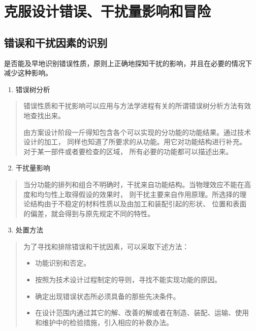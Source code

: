 \documentclass[letterpaper,10pt,english]{sphinxmanual}
\begin{document}
\section{克服设计错误、干扰量影响和冒险}
\label{unit6:id24}

\subsection{错误和干扰因素的识别}
\label{unit6:id25}
是否能及早地识别错误性质，原则上正确地探知干扰的影响，并且在必要的情况下减少这种影响。
\begin{enumerate}
\item {} 
错误树分析

\end{enumerate}
\begin{quote}

错误性质和干扰影响可以应用与方法学进程有关的所谓错误树分析方法有效地查找出来。

由方案设计阶段一斤得知包含各个可以实现的分功能的功能结果。通过技术设计的加工，
同样也知道了所要求的从功能。用它对功能结构进行补充。对于某一部件或者要检查的区域，
所有必要的功能都可以描述出来。
\end{quote}
\begin{enumerate}
\setcounter{enumi}{1}
\item {} 
干扰量影响

\end{enumerate}
\begin{quote}

当分功能的排列和组合不明确时，干扰来自功能结构。当物理效应不能在高度和均匀性上取得假设的效果时，
则干扰主要来自作用原理。所选择的理论结构由于不稳定的材料性质以及由加工和装配引起的形状、
位置和表面的偏差，就会得到与原先规定不同的特性。
\end{quote}
\begin{enumerate}
\setcounter{enumi}{2}
\item {} 
处置方法

\end{enumerate}
\begin{quote}

为了寻找和排除错误和干扰因素，可以采取下述方法：
\begin{itemize}
\item {} 
功能识别和否定。

\item {} 
按照为技术设计过程制定的导则，寻找不能实现功能的原因。

\item {} 
确定出现错误状态所必须具备的那些先决条件。

\item {} 
在设计范围内通过其它的解、改善的解或者在制造、装配、运输、使用和维护中的检验措施，引入相应的补救办法。

\end{itemize}
\end{quote}
\end{document}
